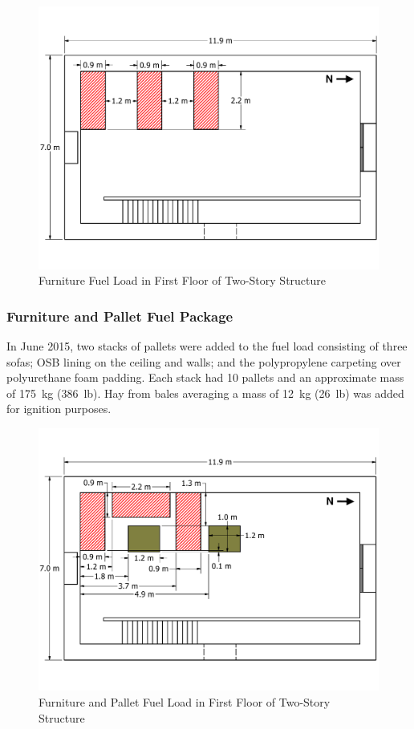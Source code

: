 \documentclass[12pt,oneside]{book}
\begin{document}
\begin{figure}[!ht]
	\includegraphics[width=\columnwidth]{../../DelCo_2014_2015/Drawings/PDFs/CAFS/West_Structure_1st_Floor_Furniture_Only}
	\caption{Furniture Fuel Load in First Floor of Two-Story Structure}
	\label{fig:furniture_2story}
\end{figure}

\subsubsection{Furniture and Pallet Fuel Package}
\label{sec:fire_suppression_combo_fuel_2}

In June 2015, two stacks of pallets were added to the fuel load consisting of three sofas; OSB lining on the ceiling and walls; and the polypropylene carpeting over polyurethane foam padding. Each stack had 10 pallets and an approximate mass of 175~kg (386~lb). Hay from bales averaging a mass of 12~kg (26~lb) was added for ignition purposes.

\begin{figure}[!ht]
	\includegraphics[width=\columnwidth]{../../DelCo_2014_2015/Drawings/PDFs/CAFS/West_Structure_1st_Floor_Furniture_Pallets}
	\caption{Furniture and Pallet Fuel Load in First Floor of Two-Story Structure}
	\label{fig:pallet_furniture_2story}
\end{figure}
\end{document}
